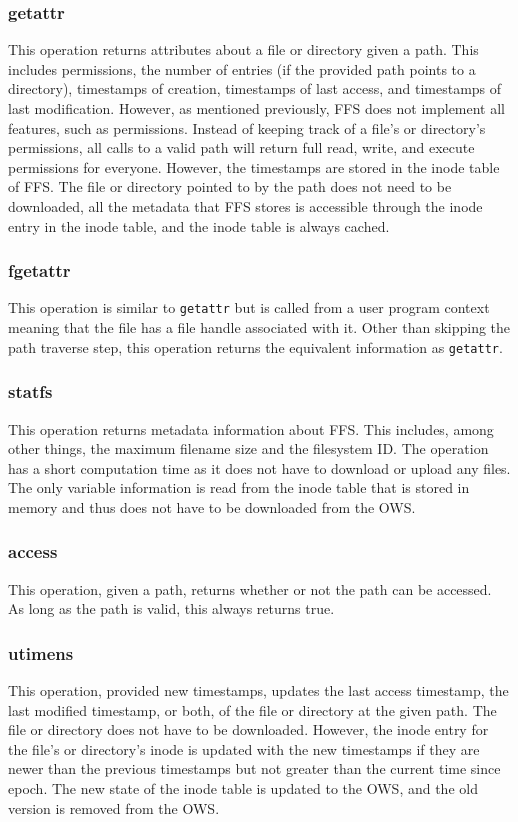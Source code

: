 \subsubsection{getattr}
This operation returns attributes about a file or directory given a path. This includes permissions, the number of entries (if the provided path points to a directory), timestamps of creation, timestamps of last access, and timestamps of last modification. However, as mentioned previously, \gls{FFS} does not implement all features, such as permissions. Instead of keeping track of a file's or directory's permissions, all calls to a valid path will return full read, write, and execute permissions for everyone. However, the timestamps are stored in the inode table of \gls{FFS}. The file or directory pointed to by the path does not need to be downloaded, all the metadata that \gls{FFS} stores is accessible through the inode entry in the inode table, and the inode table is always cached.

\subsubsection{fgetattr}
This operation is similar to \texttt{getattr} but is called from a user program context meaning that the file has a file handle associated with it. Other than skipping the path traverse step, this operation returns the equivalent information as \texttt{getattr}.

\subsubsection{statfs}
This operation returns metadata information about \gls{FFS}. This includes, among other things, the maximum filename size and the filesystem ID. The operation has a short computation time as it does not have to download or upload any files. The only variable information is read from the inode table that is stored in memory and thus does not have to be downloaded from the \gls{OWS}.

\subsubsection{access}
This operation, given a path, returns whether or not the path can be accessed. As long as the path is valid, this always returns true.

\subsubsection{utimens}
This operation, provided new timestamps, updates the last access timestamp, the last modified timestamp, or both, of the file or directory at the given path. The file or directory does not have to be downloaded. However, the inode entry for the file's or directory's inode is updated with the new timestamps if they are newer than the previous timestamps but not greater than the current time since epoch. The new state of the inode table is updated to the \gls{OWS}, and the old version is removed from the \gls{OWS}.

